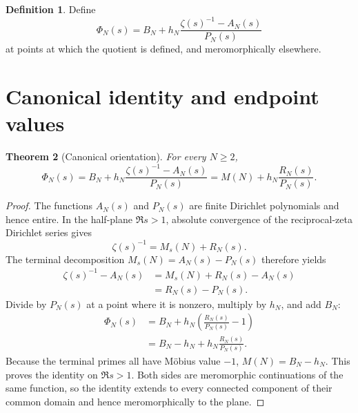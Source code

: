 \documentclass[11pt]{amsart}
\numberwithin{equation}{section}
\theoremstyle{plain}
\newtheorem{theorem}{Theorem}[section]
\theoremstyle{definition}
\newtheorem{definition}[theorem]{Definition}
\theoremstyle{remark}
\newcommand{\1}{\mathbf{1}}
\begin{document}
\begin{definition}
\label{def:PhiN}
Define
\begin{equation}
\Phi_N(s)
=
B_N+
h_N\frac{\zeta(s)^{-1}-A_N(s)}{P_N(s)}
\label{eq:PhiN_definition}
\end{equation}
at points at which the quotient is defined, and meromorphically elsewhere.
\end{definition}

\section{Canonical identity and endpoint values}
\label{sec:canonical_identity}

\begin{theorem}[Canonical orientation]
\label{thm:canonical_orientation}
For every \(N\geq2\),
\begin{equation}
\boxed{
\Phi_N(s)
=
B_N+
h_N\frac{\zeta(s)^{-1}-A_N(s)}{P_N(s)}
=
M(N)+h_N\frac{R_N(s)}{P_N(s)}.
}
\label{eq:canonical_orientation}
\end{equation}
\end{theorem}

\begin{proof}
The functions \(A_N(s)\) and \(P_N(s)\) are finite Dirichlet polynomials
and hence entire.  In the half-plane \(\Re s>1\), absolute convergence of
the reciprocal-zeta Dirichlet series gives
\begin{equation}
\zeta(s)^{-1}
=
M_s(N)+R_N(s).
\label{eq:canonical_proof_reciprocal_split}
\end{equation}
The terminal decomposition \(M_s(N)=A_N(s)-P_N(s)\) therefore yields
\begin{align}
\zeta(s)^{-1}-A_N(s)
&=
M_s(N)+R_N(s)-A_N(s)
\label{eq:canonical_proof_step_one}
\\
&=
R_N(s)-P_N(s).
\label{eq:canonical_proof_step_two}
\end{align}
Divide by \(P_N(s)\) at a point where it is nonzero, multiply by \(h_N\),
and add \(B_N\):
\begin{align}
\Phi_N(s)
&=
B_N+h_N\left(\frac{R_N(s)}{P_N(s)}-1\right)
\label{eq:canonical_proof_step_three}
\\
&=
B_N-h_N+h_N\frac{R_N(s)}{P_N(s)}.
\label{eq:canonical_proof_step_four}
\end{align}
Because the terminal primes all have Möbius value \(-1\),
\(M(N)=B_N-h_N\).  This proves the identity on \(\Re s>1\).  Both sides
are meromorphic continuations of the same function, so the identity extends
to every connected component of their common domain and hence
meromorphically to the plane.
\end{proof}
\end{document}
